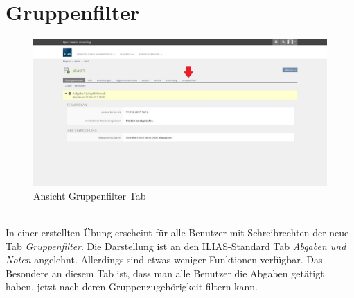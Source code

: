 \chapter{Gruppenfilter}\label{gruppenfilter}
\begin{figure}[h!]
	\centering
	\includegraphics[width=1\textwidth]{img/excerciseGruppenfilter.jpg}
	\caption{Ansicht Gruppenfilter Tab}
\end{figure}

~\\In einer erstellten Übung erscheint für alle Benutzer mit Schreibrechten der neue Tab \textit{Gruppenfilter}. Die Darstellung ist an den ILIAS-Standard Tab \textit{Abgaben und Noten} angelehnt. Allerdings sind etwas weniger Funktionen verfügbar. Das Besondere an diesem Tab ist, dass man alle Benutzer die Abgaben getätigt haben, jetzt nach deren Gruppenzugehörigkeit filtern kann.
\newpage
